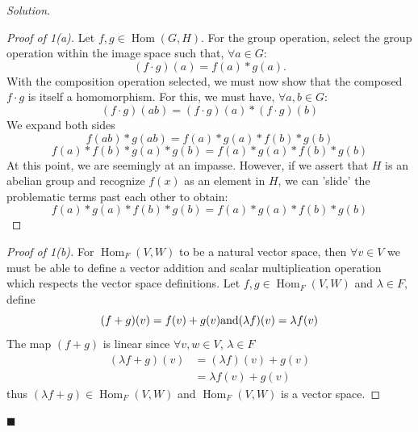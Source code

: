 \documentclass[11pt]{article}
\theoremstyle{plain}
\theoremstyle{definition}
\newenvironment{solution}{%
  \par\noindent\textit{Solution.}\
}{%
  \hfill$\blacksquare$\par\bigskip
}
\newcommand{\Hom}{\operatorname{Hom}}
\begin{document}
\begin{solution}
  \begin{proof}[Proof of 1(a)]
    Let \( f,g\in \Hom(G,H) \). For the group operation, select
    the group operation within the image space such that, \( \forall a\in G\):
    \[
      (f\cdot g)(a)=f(a)*g(a).
    \]
    With the composition operation selected, we must now show that
    the composed \( f\cdot g \) is itself a homomorphism. For this,
    we must have, \( \forall a,b\in G \):
    \[
      (f\cdot g)(ab)=(f\cdot g)(a) * (f\cdot g)(b)
    \]
    We expand both sides
    \[
      f(ab)*g(ab)=f(a)*g(a)*f(b)*g(b)
    \]
    \[
      f(a)*f(b)*g(a)*g(b)=f(a)*g(a)*f(b)*g(b)
    \]
    At this point, we are seemingly at an impasse. However, if we assert that
    \( H \) is an abelian group and recognize \( f(x) \) as an
    element in \( H \),
    we can 'slide' the problematic terms past each other to obtain:
    \[
      f(a)*g(a)*f(b)*g(b)=f(a)*g(a)*f(b)*g(b)
    \]

  \end{proof}

  \begin{proof}[Proof of 1(b)]
    For \( \Hom_F(V, W) \) to be a natural vector space, then \(
    \forall v\in V \) we must be able to define
    a vector addition and scalar multiplication operation which
    respects the vector space definitions. Let \( f, g \in
    \Hom_F(V,W) \) and \( \lambda \in F \), define
    \[
      (f + g)(v) = f(v) + g(v) \\
      \text{and} \\
      (\lambda f)(v) = \lambda f(v)
    \]
    The map \( (f + g) \) is linear since \( \forall v, w \in V \),
    \( \lambda\in F \)
    \begin{align*}
      (\lambda f + g)(v) &= (\lambda f)(v) + g(v) \\
      &= \lambda f(v) + g(v)
    \end{align*}
    thus \( (\lambda f + g) \in \Hom_F(V, W) \) and \( \Hom_F(V,W) \)
    is a vector space.
  \end{proof}


\end{solution}
\end{document}
